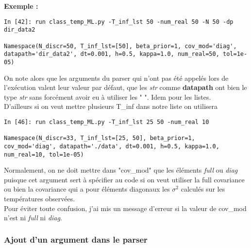 \documentclass[a4paper,12pt]{article}
\newcommand\bk{\color{black}}
\newcommand{\dgreen}{\color{dgreen}}
\numberwithin{equation}{section} %
\begin{document}
\pagebreak

\dgreen \textbf {Exemple :} \bk \\
\begin{lstlisting}
In [42]: run class_temp_ML.py -T_inf_lst 50 -num_real 50 -N 50 -dp dir_data2

Namespace(N_discr=50, T_inf_lst=[50], beta_prior=1, cov_mod='diag', datapath='dir_data2', dt=0.001, h=0.5, kappa=1.0, num_real=50, tol=1e-05)

\end{lstlisting}
On note alors que les arguments du parser qui n'ont pas été appelés lors de l'exécution valent leur valeur par défaut, que les \textit{str} comme \textbf{datapath} ont bien le type \textit{str} sans forcément avoir eu à utiliser les " ". Idem pour les listes. \\

\noindent D'ailleurs si on veut mettre plusieurs T\_inf dans notre liste on utilisera 

\begin{lstlisting}
In [46]: run class_temp_ML.py -T_inf_lst 25 50 -num_real 10

Namespace(N_discr=33, T_inf_lst=[25, 50], beta_prior=1, cov_mod='diag', datapath='./data', dt=0.001, h=0.5, kappa=1.0, num_real=10, tol=1e-05)
\end{lstlisting}

\noindent Normalement, on ne doit mettre dans "cov\_mod" que les éléments \textit{full} ou \textit{diag} puisque cet argument sert à spécifier au code si on veut utiliser la full covariance ou bien la covariance qui a 
pour éléments diagonaux les $\sigma^2$ calculés sur les températures observées. \\
Pour éviter toute confusion, j'ai mis un message d'erreur si la valeur de cov\_mod n'est ni \textit{full} ni \textit{diag}.

\subsubsection*{Ajout d'un argument dans le parser}
\end{document}
